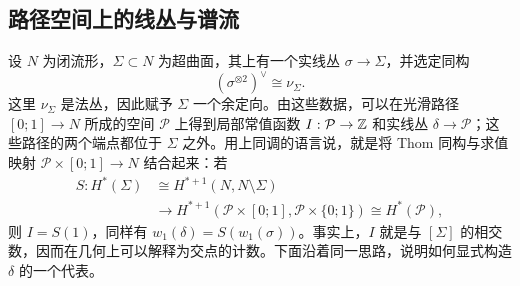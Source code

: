 \subsection{路径空间上的线丛与谱流}\label{sec:11b}
设 $N$ 为闭流形，$\Sigma\subset N$ 为超曲面，其上有一个实线丛 $\sigma\to\Sigma$，并选定同构
\begin{equation}\label{eq:11.4}
(\sigma^{\otimes2})^\vee\cong\nu_\Sigma.
\end{equation}
这里 $\nu_\Sigma$ 是法丛，因此赋予 $\Sigma$ 一个余定向。由这些数据，可以在光滑路径 $[0;1]\to N$ 所成的空间 $\mathcal P$ 上得到局部常值函数 $I:\mathcal P\to\mathbb Z$ 和实线丛 $\delta\to\mathcal P$；这些路径的两个端点都位于 $\Sigma$ 之外。用上同调的语言说，就是将 Thom 同构与求值映射 $\mathcal P\times[0;1]\to N$ 结合起来：若
\[
\begin{aligned}
S:H^*(\Sigma)&\cong H^{*+1}(N,N\setminus\Sigma)\\
&\longrightarrow H^{*+1}(\mathcal P\times[0;1],\mathcal P\times\{0;1\})\cong H^*(\mathcal P),
\end{aligned}
\]
则 $I=S(1)$，同样有 $w_1(\delta)=S(w_1(\sigma))$。事实上，$I$ 就是与 $[\Sigma]$ 的相交数，因而在几何上可以解释为交点的计数。下面沿着同一思路，说明如何显式构造 $\delta$ 的一个代表。

